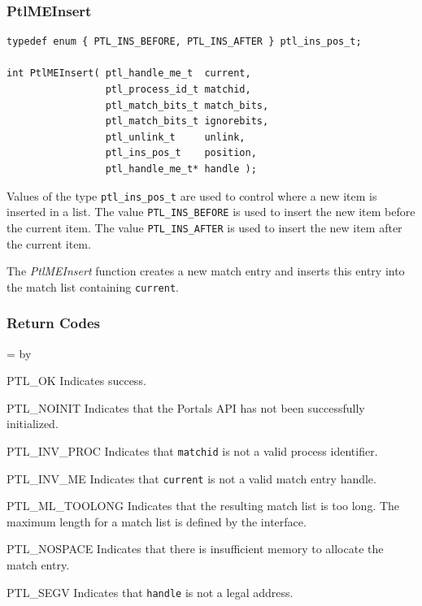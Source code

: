 \documentclass{sand-report}
\newcommand{\retlabel}[1]{\mbox{\texttt{#1}}\hfil}
\newenvironment{returns}%
  {\begin{list}{}%
      {\renewcommand{\makelabel}{\retlabel}%
        \topsep=0.0pt%
        \labelwidth=1.25in%
        \leftmargin=\labelwidth%
        \advance \leftmargin by \labelsep%
        \setlength{\itemsep}{.5\smallskipamount}%
        \setlength{\parsep}{0pt}}%
      }%
  {\end{list}}
\begin{document}
\subsubsection{PtlMEInsert}\label{sec:meinsert}
\begin{verbatim}
typedef enum { PTL_INS_BEFORE, PTL_INS_AFTER } ptl_ins_pos_t;

int PtlMEInsert( ptl_handle_me_t  current,
                 ptl_process_id_t matchid,
                 ptl_match_bits_t match_bits,
                 ptl_match_bits_t ignorebits,
                 ptl_unlink_t     unlink,
                 ptl_ins_pos_t    position,
                 ptl_handle_me_t* handle );
\end{verbatim}

\noindent
Values of the type \texttt{ptl_ins_pos_t} are used to control where a
new item is inserted in a list.  The value \texttt{PTL_INS_BEFORE} is
used to insert the new item before the current item.  The value
\texttt{PTL_INS_AFTER} is used to insert the new item after the
current item.

The \emph{PtlMEInsert} function creates a new match entry and inserts
this entry into the match list containing \texttt{current}.

\subsubsection*{Return Codes}
\begin{returns}
\item[PTL_OK] Indicates success.
\item[PTL_NOINIT] Indicates that the Portals API has not been
  successfully initialized.
\item[PTL_INV_PROC] Indicates that \texttt{matchid} is not a valid
  process identifier.
\item[PTL_INV_ME] Indicates that \texttt{current} is not a valid match
  entry handle.
\item[PTL_ML_TOOLONG] Indicates that the resulting match list is too
  long.  The maximum length for a match list is defined by the
  interface.
\item[PTL_NOSPACE] Indicates that there is insufficient memory to
  allocate the match entry.
\item[PTL_SEGV] Indicates that \texttt{handle} is not a legal address.
\end{returns}
\end{document}
